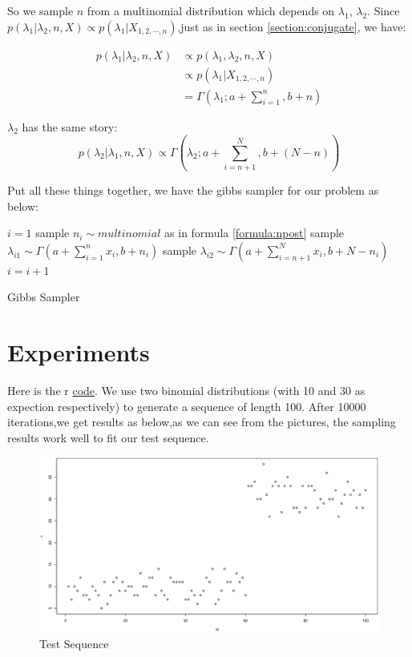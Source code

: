 \documentclass[12pt]{article}
\begin{document}
So we sample $n$ from a multinomial distribution which depends on $\lambda_1$, $\lambda_2$. Since $p(\lambda_1|\lambda_2,n,X) \propto p(\lambda_1|X_{1,2,\cdots,n})$,just as in section \ref{section:conjugate}, we have:

\begin{equation}
\begin{split}
p(\lambda_1|\lambda_2,n,X) & \propto p(\lambda_1,\lambda_2,n,X) \\  
						   & \propto p(\lambda_1|X_{1,2,\cdots,n}) \\
						   & = \Gamma(\lambda_1;a + \sum_{i=1}^n,b + n)
\end{split}
\end{equation}

$\lambda_2$ has the same story:
\begin{equation}
p(\lambda_2|\lambda_1,n,X) \propto \Gamma(\lambda_2; a + \sum_{i=n+1}^N,b+(N-n))
\end{equation}

Put all these things together, we have the gibbs sampler for our problem as below:

\begin{algorithm}[H]
$i = 1$\;
 {
	sample $n_i \sim multinomial$ as in formula \ref{formula:npost}\;
	sample $\lambda_{i1} \sim \Gamma(a+\sum_{i=1}^nx_i,b+n_i)$\;
	sample $\lambda_{i2} \sim \Gamma(a+\sum_{i=n+1}^Nx_i,b+N-n_i)$\;
	$i = i + 1$\;
}
\caption{Gibbs Sampler}
\end{algorithm}

\section{Experiments}
Here is the r \href{https://github.com/lleia/miscelaneous/blob/master/r/change_point_model/sampling.r}{code}. We use two binomial distributions (with 10 and 30 as expection respectively) to generate a sequence of length 100. After 10000 iterations,we get results as below,as we can see from the pictures, the sampling results work well to fit our test sequence.
 
\begin{figure}
\caption{Test Sequence}
\centering
	\includegraphics[width=5in]{seq.eps}
\end{figure}
\end{document}
